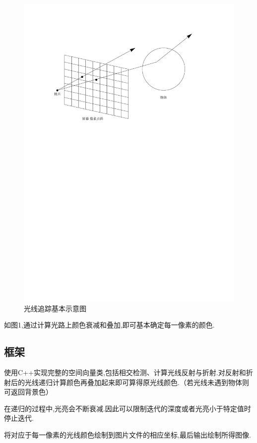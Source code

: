 \documentclass[10pt,twocolumn]{article}
\begin{document}
\begin{figure}[!ht]
\centering
\includegraphics[scale=.55]{fig1.pdf}
\caption{光线追踪基本示意图}
\end{figure}

如图1,通过计算光路上颜色衰减和叠加,即可基本确定每一像素的颜色.

\subsection{\hei 框架}
使用C++实现完整的空间向量类,包括相交检测、计算光线反射与折射.对反射和折射后的光线递归计算颜色再叠加起来即可算得原光线颜色.（若光线未遇到物体则可返回背景色）

在递归的过程中,光亮会不断衰减.因此可以限制迭代的深度或者光亮小于特定值时停止迭代.

将对应于每一像素的光线颜色绘制到图片文件的相应坐标,最后输出绘制所得图像.
\end{document}
